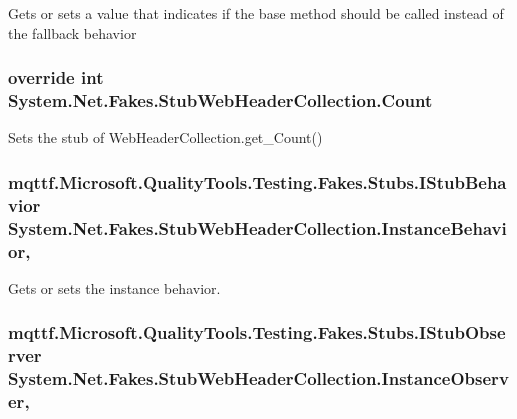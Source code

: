 Gets or sets a value that indicates if the base method should be called instead of the fallback behavior

\hypertarget{class_system_1_1_net_1_1_fakes_1_1_stub_web_header_collection_a2690c13bc8d9c469a384462603f81705}{
\subsubsection[{Count}]{\setlength{\rightskip}{0pt plus 5cm}override int System.\-Net.\-Fakes.\-Stub\-Web\-Header\-Collection.\-Count\hspace{0.3cm}{\ttfamily [get]}}}\label{class_system_1_1_net_1_1_fakes_1_1_stub_web_header_collection_a2690c13bc8d9c469a384462603f81705}


Sets the stub of Web\-Header\-Collection.\-get\-\_\-\-Count()

\hypertarget{class_system_1_1_net_1_1_fakes_1_1_stub_web_header_collection_ab4f9942261585fd109c6e9599f9464b0}{
\subsubsection[{Instance\-Behavior}]{\setlength{\rightskip}{0pt plus 5cm}mqttf.\-Microsoft.\-Quality\-Tools.\-Testing.\-Fakes.\-Stubs.\-I\-Stub\-Behavior System.\-Net.\-Fakes.\-Stub\-Web\-Header\-Collection.\-Instance\-Behavior\hspace{0.3cm}{\ttfamily [get]}, {\ttfamily [set]}}}\label{class_system_1_1_net_1_1_fakes_1_1_stub_web_header_collection_ab4f9942261585fd109c6e9599f9464b0}


Gets or sets the instance behavior.

\hypertarget{class_system_1_1_net_1_1_fakes_1_1_stub_web_header_collection_aa13ccfde0b54d8cd8bef4175a2c414b3}{
\subsubsection[{Instance\-Observer}]{\setlength{\rightskip}{0pt plus 5cm}mqttf.\-Microsoft.\-Quality\-Tools.\-Testing.\-Fakes.\-Stubs.\-I\-Stub\-Observer System.\-Net.\-Fakes.\-Stub\-Web\-Header\-Collection.\-Instance\-Observer\hspace{0.3cm}{\ttfamily [get]}, {\ttfamily [set]}}}\label{class_system_1_1_net_1_1_fakes_1_1_stub_web_header_collection_aa13ccfde0b54d8cd8bef4175a2c414b3}


